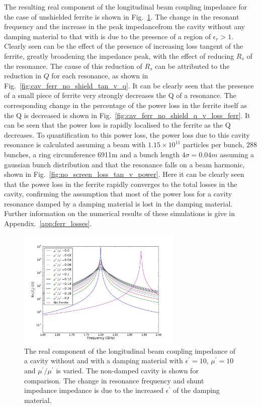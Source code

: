 The resulting real component of the longitudinal beam coupling impedance for the case of unshielded ferrite is shown in Fig.~\ref{fig:no_screen_long_imp}. The change in the resonant frequency and the increase in the peak impedancefrom the cavity without any damping material to that with is due to the presence of a region of $\epsilon_{r}>1$. Clearly seen can be the effect of the presence of increasing loss tangent of the ferrite, greatly broadening the impedance peak, with the effect of reducing $R_{s}$ of the resonance. The cause of this reduction of $R_{s}$ can be attributed to the reduction in $Q$ for each resonance, as shown in Fig.~\ref{fig:cav_ferr_no_shield_tan_v_q}. It can be clearly seen that the presence of a small piece of ferrite very strongly decreases the Q of a resonance. The corresponding change in the percentage of the power loss in the ferrite itself as the Q is decreased is shown in Fig.~\ref{fig:cav_ferr_no_shield_q_v_loss_ferr}. It can be seen that the power loss is rapidly localised to the ferrite as the Q decreases. To quantification to this power loss, the power loss due to this cavity resonance is calculated assuming a beam with $1.15 \times 10^{11}$ particles per bunch, 288 bunches, a ring circumference 6911m and a bunch length $4\sigma = 0.04m$ assuming a gaussian bunch distribution and that the resonance falls on a beam harmonic, shown in Fig.~\ref{fig:no_screen_loss_tan_v_power}. Here it can be clearly seen that the power loss in the ferrite rapidly converges to the total losses in the cavity, confirming the assumption that most of the power loss for a cavity resonance damped by a damping material is lost in the damping material. Further information on the numerical results of these simulations is give in Appendix.~\ref{app:ferr_losses}.

\begin{figure}
\begin{center}
\includegraphics[width=0.7\textwidth]{Beam_Coupling_Impedance_Reduction_Techniques/figures/no_screen_long_imp_all.pdf}
\end{center}
\label{fig:no_screen_long_imp}
\caption{The real component of the longitudinal beam coupling impedance of a cavity without and with a damping material with $\epsilon^{'}=10$, $\mu^{'}=10$ and $\mu^{'}/\mu^{'}$ is varied. The non-damped cavity is shown for comparison. The change in resonance frequency and shunt impedance impedance is due to the increased $\epsilon^{'}$ of the damping material.}
\end{figure}

